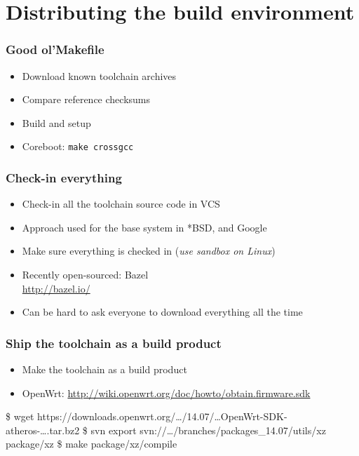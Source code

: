 \documentclass[14pt,aspectratio=169]{beamer}
\begin{document}
\section{Distributing the build environment}

\begin{frame}
 \frametitle{Good ol'Makefile}

 \begin{itemize}
  \item Download known toolchain archives
  \item Compare reference checksums
  \item Build and setup
  \item Coreboot: \texttt{make crossgcc}
 \end{itemize}
\end{frame}

\begin{frame}
 \frametitle{Check-in everything}

 \begin{itemize}
  \item Check-in all the toolchain source code in VCS
  \item Approach used for the base system in *BSD, and Google
  \item Make sure everything is checked in (\textit{use sandbox on Linux})
  \item Recently open-sourced: Bazel \\
   \url{http://bazel.io/}
  \item Can be hard to ask everyone to download everything all the time
 \end{itemize}
\end{frame}

\begin{frame}[fragile]
 \frametitle{Ship the toolchain as a build product}

 \begin{itemize}
  \item Make the toolchain as a build product
  \item OpenWrt:
    \url{http://wiki.openwrt.org/doc/howto/obtain.firmware.sdk}
 \end{itemize}

 \begin{example}\footnotesize
\begin{semiverbatim}
\$ wget https://downloads.openwrt.org/…/14.07/…OpenWrt-SDK-atheros-….tar.bz2
\$ svn export svn://…/branches/packages\_14.07/utils/xz package/xz
\$ make package/xz/compile
\end{semiverbatim}
 \end{example}

\end{frame}
\end{document}
